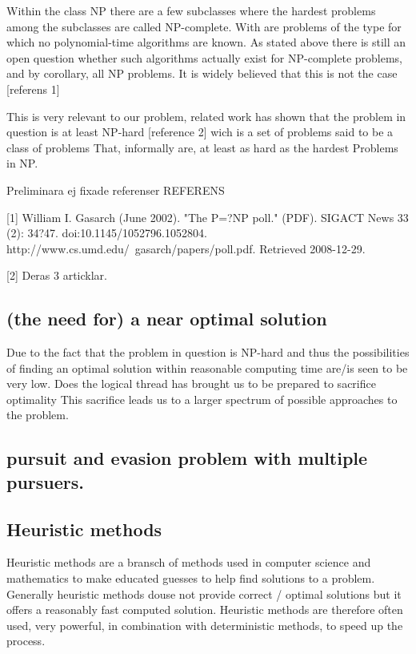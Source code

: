  
Within the class NP there are a few subclasses  where the hardest problems among the subclasses are called NP-complete. With are problems of the type for which no polynomial-time algorithms are known. As stated above there is still an open question whether such algorithms actually exist for NP-complete problems, and by corollary, all NP problems. It is widely believed that this is not the case [referens 1]
 
This is very relevant to our problem, related work has shown that the problem in question is at least NP-hard [reference 2] wich is a set of problems said to be a class of problems That, informally are, at least as hard as the hardest Problems in NP.
 
 
Preliminara ej fixade referenser
REFERENS
 
[1]
William I. Gasarch (June 2002). "The P=?NP poll." (PDF). SIGACT News 33 (2): 34?47. doi:10.1145/1052796.1052804. http://www.cs.umd.edu/~gasarch/papers/poll.pdf. Retrieved 2008-12-29. 
 
[2]
Deras 3 articklar.
 
\subsection{(the need for) a near optimal solution}
 
Due to the fact that the problem in question is NP-hard and thus the possibilities of finding an optimal solution within reasonable computing time are/is seen to be very low. Does the logical thread has brought us to be prepared to sacrifice optimality
This sacrifice leads us to a larger spectrum of possible approaches to the problem.
 \subsection {pursuit and evasion problem with multiple pursuers.}
\subsection{Heuristic methods}
 
Heuristic methods are a bransch of methods used in computer science and mathematics to make educated guesses to help find solutions to a problem. Generally heuristic methods douse not provide correct / optimal solutions but it offers a reasonably fast computed solution. Heuristic methods are therefore often used, very powerful, in combination with deterministic methods, to speed up the process.
 
